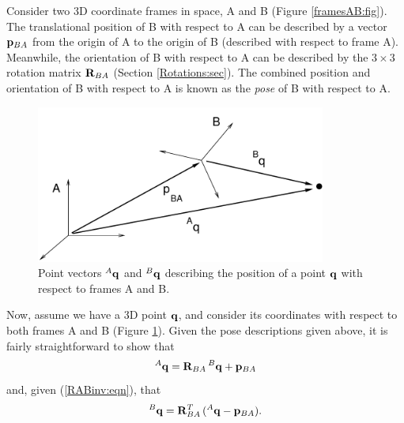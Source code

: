 Consider two 3D coordinate frames in space, A and B (Figure
\ref{framesAB:fig}). The translational position of B with respect to A
can be described by a vector ${\bf p}_{BA}$ from the origin of A to the
origin of B (described with respect to frame A). Meanwhile, the
orientation of B with respect to A can be described by the $3 \times
3$ rotation matrix ${\bf R}_{BA}$ (Section \ref{Rotations:sec}).  The
combined position and orientation of B with respect to A is known as
the {\it pose} of B with respect to A.

\begin{figure}[t]
\begin{center}
 \includegraphics[width=3.75in]{images/pointsAB}
\end{center}
\caption{Point vectors ${}^A{\bf q}$ and ${}^B{\bf q}$ describing
the position of a point ${\bf q}$ with respect to frames A and B.}
\label{pointsAB:fig}
\end{figure}

Now, assume we have a 3D point ${\bf q}$, and consider its coordinates with
respect to both frames A and B (Figure \ref{pointsAB:fig}). Given the
pose descriptions given above, it is fairly straightforward to show
that
%
\begin{equation}
{}^A{\bf q} = {\bf R}_{BA} \, {}^B{\bf q} + {\bf p}_{BA}
\label{pointTransform:eqn}
\end{equation}
%
and, given (\ref{RABinv:eqn}), that
%
\begin{equation}
{}^B{\bf q} = {\bf R}_{BA}^T \, ({}^A{\bf q} - {\bf p}_{BA}).
\label{pointInvTransform:eqn}
\end{equation}
%

